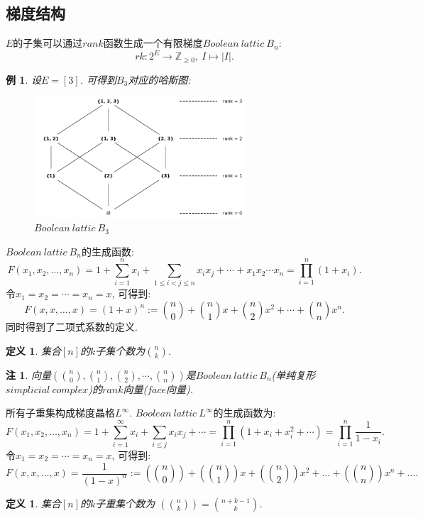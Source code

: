 \documentclass[12pt,a4paper]{ctexbook} %
\newcounter{theorem}[section]
\newtheorem{definition}[theorem]{定义}
\newtheorem{example}[theorem]{例}
\newtheorem{remark}[theorem]{注}
\numberwithin{figure}{section}
\theoremstyle{problemstyle}
\numberwithin{equation}{section} %
\begin{document}
	\subsection{梯度结构}
	
	$E$的子集可以通过$rank$函数生成一个有限梯度$Boolean\ lattic\ B_n$:
	$$rk: 2^E\to \mathbb{Z}_{\geq 0},\ I\mapsto |I|.$$
	
\begin{example}
	设$E=[3]$. 可得到$B_3$对应的哈斯图: 
		\vspace{-0.4cm} %
		
\begin{figure}[H]
	\centering	
    \includegraphics[width=0.7\textwidth]{Boolean lattic B_3}
	\caption{$Boolean\ lattic\ B_3$}%
\end{figure}
\end{example}
	
	$Boolean\ lattic\ B_n$的生成函数: 
	$$F(x_1,x_2,\dots,x_n)=1+\sum_{i=1}^nx_i+\sum_{1\leq i<j\leq n}x_ix_j+\cdots+x_1x_2\cdots x_n=\prod_{i=1}^n(1+x_i).$$
	令$x_1=x_2=\cdots=x_n=x$, 可得到: 
	$$F(x,x,\dots,x)=(1+x)^n :=\binom{n}{0}+\binom{n}{1}x+\binom{n}{2}x^2+\cdots+\binom{n}{n}x^n.$$
	同时得到了二项式系数的定义. 
	
	\begin{definition}
		集合$[n]$的$k$子集个数为$\binom{n}{k}$.
	\end{definition}
	
	\begin{remark}
		向量$(\binom{n}{0},\binom{n}{1},\binom{n}{2},\cdots,\binom{n}{n})$是$Boolean\ lattic\ B_n$(单纯复形$simplicial\ complex$)的$rank$向量($face$向量).
	\end{remark}
	
	所有子重集构成梯度晶格$L^{\infty}$. $Boolean\ lattic\ L^{\infty}$的生成函数为: 
	$$F(x_1,x_2,\dots,x_n)=1+\sum_{i=1}^{\infty}x_i+\sum_{i\leq j}x_ix_j+\cdots=\prod_{i=1}^n(1+x_i+x_i^2+\cdots)=\prod_{i=1}^n\frac{1}{1-x_i}.$$
	令$x_1=x_2=\cdots=x_n=x$, 可得到: 
	$$F(x, x, \dots, x) = \frac{1}{(1-x)^n} :=
    \left(\!\!{n\choose 0}\!\!\right) +\left(\!\!{n\choose 1}\!\!\right)x +\left(\!\!{n\choose 2}\!\!\right)x^2 + \dots 
    + \left(\!\!{n\choose n}\!\!\right)x^n +\dots.$$
	\begin{definition}
		集合$[n]$的$k$子重集个数为 $\left(\!\!{n\choose k}\!\!\right)=\binom{n+k-1}{k}$.
	\end{definition}
	
\end{document}
